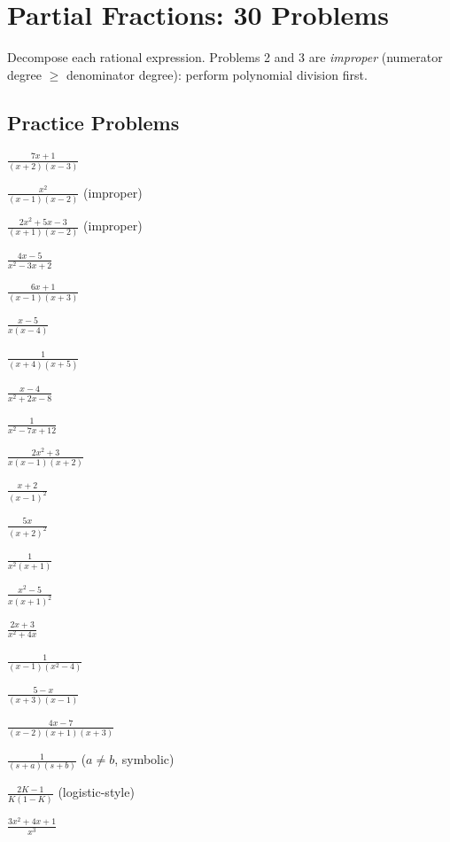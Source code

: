 \chapter{Partial Fractions: 30 Problems}

Decompose each rational expression. Problems 2 and 3 are \emph{improper}
(numerator degree $\ge$ denominator degree): perform polynomial division
first.

\section{Practice Problems}

\begin{problems}
  \item $\displaystyle\frac{7x+1}{(x+2)(x-3)}$
  \item $\displaystyle\frac{x^{2}}{(x-1)(x-2)}$ (improper)
  \item $\displaystyle\frac{2x^{2}+5x-3}{(x+1)(x-2)}$ (improper)
  \item $\displaystyle\frac{4x-5}{x^{2}-3x+2}$
  \item $\displaystyle\frac{6x+1}{(x-1)(x+3)}$
  \item $\displaystyle\frac{x-5}{x(x-4)}$
  \item $\displaystyle\frac{1}{(x+4)(x+5)}$
  \item $\displaystyle\frac{x-4}{x^{2}+2x-8}$
  \item $\displaystyle\frac{1}{x^{2}-7x+12}$
  \item $\displaystyle\frac{2x^{2}+3}{x(x-1)(x+2)}$
  \item $\displaystyle\frac{x+2}{(x-1)^{2}}$
  \item $\displaystyle\frac{5x}{(x+2)^{2}}$
  \item $\displaystyle\frac{1}{x^{2}(x+1)}$
  \item $\displaystyle\frac{x^{2}-5}{x(x+1)^{2}}$
  \item $\displaystyle\frac{2x+3}{x^{2}+4x}$
  \item $\displaystyle\frac{1}{(x-1)(x^{2}-4)}$
  \item $\displaystyle\frac{5-x}{(x+3)(x-1)}$
  \item $\displaystyle\frac{4x-7}{(x-2)(x+1)(x+3)}$
  \item $\displaystyle\frac{1}{(s+a)(s+b)}$ ($a\neq b$, symbolic)
  \item $\displaystyle\frac{2K-1}{K(1-K)}$ (logistic-style)
  \item $\displaystyle\frac{3x^{2}+4x+1}{x^{3}}$

\end{problems}
